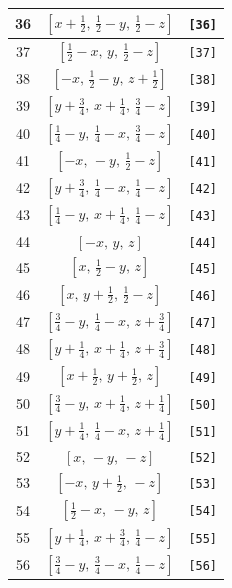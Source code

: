 \documentclass[fleqn,8pt]{jsarticle}
\begin{document}
\begin{longtable}{ccc}
36 & $\left[ x + \frac{1}{2},\, \frac{1}{2} - y,\, \frac{1}{2} - z \right]$ & {\tt [36]} \\ \hline
37 & $\left[ \frac{1}{2} - x,\, y,\, \frac{1}{2} - z \right]$ & {\tt [37]} \\ \hline
38 & $\left[ - x,\, \frac{1}{2} - y,\, z + \frac{1}{2} \right]$ & {\tt [38]} \\ \hline
39 & $\left[ y + \frac{3}{4},\, x + \frac{1}{4},\, \frac{3}{4} - z \right]$ & {\tt [39]} \\ \hline
40 & $\left[ \frac{1}{4} - y,\, \frac{1}{4} - x,\, \frac{3}{4} - z \right]$ & {\tt [40]} \\ \hline
41 & $\left[ - x,\, - y,\, \frac{1}{2} - z \right]$ & {\tt [41]} \\ \hline
42 & $\left[ y + \frac{3}{4},\, \frac{1}{4} - x,\, \frac{1}{4} - z \right]$ & {\tt [42]} \\ \hline
43 & $\left[ \frac{1}{4} - y,\, x + \frac{1}{4},\, \frac{1}{4} - z \right]$ & {\tt [43]} \\ \hline
44 & $\left[ - x,\, y,\, z \right]$ & {\tt [44]} \\ \hline
45 & $\left[ x,\, \frac{1}{2} - y,\, z \right]$ & {\tt [45]} \\ \hline
46 & $\left[ x,\, y + \frac{1}{2},\, \frac{1}{2} - z \right]$ & {\tt [46]} \\ \hline
47 & $\left[ \frac{3}{4} - y,\, \frac{1}{4} - x,\, z + \frac{3}{4} \right]$ & {\tt [47]} \\ \hline
48 & $\left[ y + \frac{1}{4},\, x + \frac{1}{4},\, z + \frac{3}{4} \right]$ & {\tt [48]} \\ \hline
49 & $\left[ x + \frac{1}{2},\, y + \frac{1}{2},\, z \right]$ & {\tt [49]} \\ \hline
50 & $\left[ \frac{3}{4} - y,\, x + \frac{1}{4},\, z + \frac{1}{4} \right]$ & {\tt [50]} \\ \hline
51 & $\left[ y + \frac{1}{4},\, \frac{1}{4} - x,\, z + \frac{1}{4} \right]$ & {\tt [51]} \\ \hline
52 & $\left[ x,\, - y,\, - z \right]$ & {\tt [52]} \\ \hline
53 & $\left[ - x,\, y + \frac{1}{2},\, - z \right]$ & {\tt [53]} \\ \hline
54 & $\left[ \frac{1}{2} - x,\, - y,\, z \right]$ & {\tt [54]} \\ \hline
55 & $\left[ y + \frac{1}{4},\, x + \frac{3}{4},\, \frac{1}{4} - z \right]$ & {\tt [55]} \\ \hline
56 & $\left[ \frac{3}{4} - y,\, \frac{3}{4} - x,\, \frac{1}{4} - z \right]$ & {\tt [56]} \\ \hline

\end{longtable}
\end{document}

